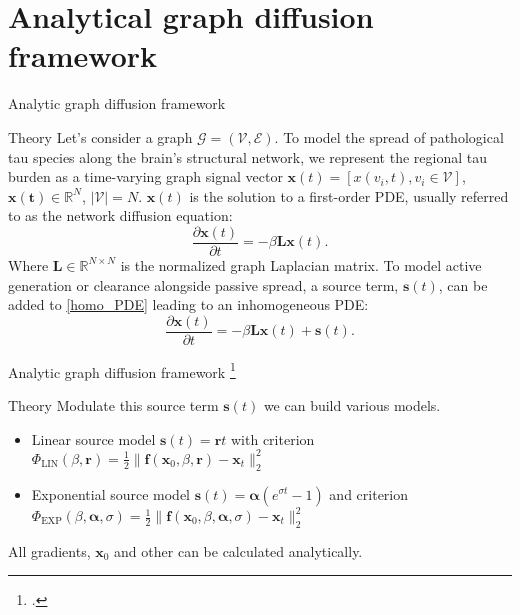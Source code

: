 \documentclass{beamer}
\begin{document}
\section{Analytical graph diffusion framework}
\begin{frame}{Analytic graph diffusion framework}
    \begin{block}{Theory}
        Let's consider a graph $\mathcal{G} = (\mathcal{V}, \mathcal{E})$. To model the spread of pathological tau species along the brain’s structural network, we represent the regional tau burden as a time-varying graph signal vector $\boldsymbol{x}(t) = [x(v_i, t), v_i \in\mathcal{V}]$, $\boldsymbol{x(t)} \in \mathbb{R}^N$, $|\mathcal{V}|=N$. $\boldsymbol{x}(t)$ is the solution to a first-order PDE, usually referred to as the network diffusion equation:
        \begin{equation}\label{homo_PDE}
            \dfrac{\partial\boldsymbol{x}(t)}{\partial t} = -\beta\boldsymbol{L}\boldsymbol{x}(t).
        \end{equation}
        Where $\boldsymbol{L} \in \mathbb{R}^{N\times N}$ is the normalized graph Laplacian matrix. To model active generation or clearance alongside passive spread, a source term, $\boldsymbol{s}(t)$, can be added to \eqref{homo_PDE} leading to an inhomogeneous PDE:
        \begin{equation}\label{inhomo_PDE}
            \dfrac{\partial\boldsymbol{x}(t)}{\partial t} = -\beta\boldsymbol{L}\boldsymbol{x}(t) + \boldsymbol{s}(t).
        \end{equation}
    \end{block}
\end{frame}

\begin{frame}{Analytic graph diffusion framework \footcite{yang2021longitudinal}}
    \begin{block}{Theory}
        Modulate this source term $\boldsymbol{s}(t)$ we can build various models. 
        \begin{itemize}
            \item Linear source model $\boldsymbol{s}(t) = \boldsymbol{r}t$ with criterion $\Phi_{\text{LIN}}(\beta, \boldsymbol{r}) = \frac{1}{2}\|\boldsymbol{f}(\boldsymbol{x}_0, \beta, \boldsymbol{r}) - \boldsymbol{x}_t\|^2_2$
            \item  Exponential source model $\boldsymbol{s}(t) = \boldsymbol{\alpha}(e^{\sigma t} - 1)$ and criterion $\Phi_{\text{EXP}}(\beta, \boldsymbol{\alpha}, \sigma) = \frac{1}{2}\|\boldsymbol{f}(\boldsymbol{x}_0, \beta, \boldsymbol{\alpha}, \sigma) - \boldsymbol{x}_t\|^2_2$
        \end{itemize}
        All gradients, $\boldsymbol{x}_0$ and other can be calculated analytically.
    \end{block}
\end{frame}
\end{document}
